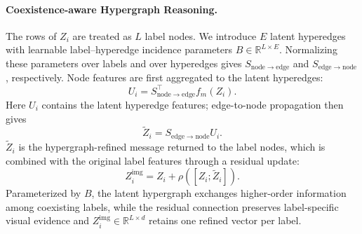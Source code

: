 \paragraph{Coexistence-aware Hypergraph Reasoning.}
The rows of $Z_i$ are treated as $L$ label nodes.  We introduce $E$ latent
hyperedges with learnable label--hyperedge incidence parameters
$B\in\mathbb{R}^{L\times E}$.  Normalizing these parameters over labels and
over hyperedges gives $S_{\mathrm{node}\rightarrow\mathrm{edge}}$ and
$S_{\mathrm{edge}\rightarrow\mathrm{node}}$, respectively.  Node features
are first aggregated to the latent hyperedges:
\begin{equation}
U_i=S_{\mathrm{node}\rightarrow\mathrm{edge}}^{\top}f_m(Z_i).
\label{eq:lccf_node_edge_new}
\end{equation}
Here $U_i$ contains the latent hyperedge features; edge-to-node propagation
then gives
\begin{equation}
\widetilde Z_i=S_{\mathrm{edge}\rightarrow\mathrm{node}}U_i.
\label{eq:lccf_edge_node_new}
\end{equation}
$\widetilde Z_i$ is the hypergraph-refined message returned to the label
nodes, which is combined with the original label features through a residual
update:
\begin{equation}
Z_i^{\mathrm{img}}=Z_i+\rho([Z_i;\widetilde Z_i]).
\label{eq:lccf_hypergraph_new}
\end{equation}
Parameterized by $B$, the latent hypergraph exchanges higher-order information
among coexisting labels, while the residual connection preserves label-specific
visual evidence and $Z_i^{\mathrm{img}}\in\mathbb{R}^{L\times d}$ retains one
refined vector per label.


